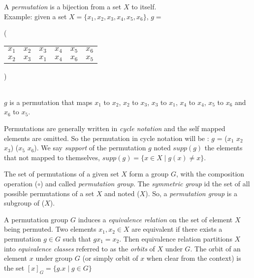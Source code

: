 A \emph{permutation} is a bijection from a set $X$ to itself.\\
 Example: given a set $X = \{x_1, x_2, x_3, x_4, x_5, x_6\}$,
$g = ${\Bigg( \begin{tabular}{cccccc}
		$x_1$ & $x_2$ & $x_3$ & $x_4$ & $x_5$ & $x_6$\\
		$x_2$ & $x_3$ & $x_1$ & $x_4$ & $x_6$ & $x_5$
	\end{tabular} \Bigg)}\\
$g$ is a permutation that maps $x_1$ to $x_2$, $x_2$ to $x_3$, $x_3$ to $x_1$, $x_4$ to $x_4$, $x_5$ to $x_6$ and $x_6$ to $x_5$.

Permutations are generally written in \emph{cycle notation} and the self mapped elements are omitted.
So the permutation in cycle notation will be : $g$ = ($x_1$ $x_2$ $x_3$) ($x_5$ $x_6$).
We say \emph{support} of the permutation $g$ noted $supp(g)$ the elements that not mapped to themselves,
$supp(g) = \{ x \in X \mid g(x) \neq x\}$.


The set of permutations of a given set $X$ form a group $G$,
with the composition operation ($\circ$) and called \emph{permutation group}.
The \emph{symmetric group} id the set of all possible permutations of a set $X$ and noted \Group($X$).
So, a \emph{permutation group} is a subgroup of \Group($X$). 


A permutation group $G$ induces a \emph{equivalence relation} on the set of element $X$ being
permuted. Two elements $x_1, x_2 \in X$ are equivalent if there exists a permutation $g \in G$ such that
$g x_1 = x_2$. Then equivalence relation partitions $X$ into \emph{equivalence classes} referred to
as the \emph{orbits} of $X$ under $G$. The orbit of an element $x$ under group $G$ (or simply orbit of $x$ when clear
from the context) is the set $[x]_G = \{g.x \mid g \in G\}$




